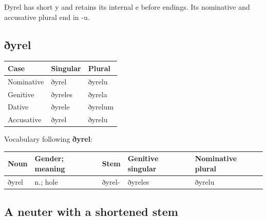 Ðyrel has short y and retains its internal e before endings. Its nominative and accusative plural end in -u.

\subsection*{ðyrel}

\par\begingroup
\fontsize{10.5}{13.2}\selectfont
\setlength{\LTleft}{0pt}\setlength{\LTright}{\fill}
\noindent
\begin{tabular}{@{}>{\raggedright\arraybackslash}p{39.46mm}>{\raggedright\arraybackslash}p{39.46mm}>{\raggedright\arraybackslash}p{39.46mm}@{}}
\toprule
\textbf{Case} & \textbf{Singular} & \textbf{Plural} \\
\midrule
Nominative & ðyrel & ðyrelu \\
Genitive & ðyreles & ðyrela \\
Dative & ðyrele & ðyrelum \\
Accusative & ðyrel & ðyrelu \\
\bottomrule
\end{tabular}
\par\endgroup

Vocabulary following \textbf{ðyrel}:

\par\begingroup
\fontsize{10.5}{13.2}\selectfont
\setlength{\LTleft}{0pt}\setlength{\LTright}{\fill}
\noindent
\begin{tabular}{@{}>{\raggedright\arraybackslash}p{20.21mm}>{\raggedright\arraybackslash}p{21.42mm}>{\raggedright\arraybackslash}p{20.21mm}>{\raggedright\arraybackslash}p{24.35mm}>{\raggedright\arraybackslash}p{26.57mm}@{}}
\toprule
\textbf{Noun} & \textbf{Gender; meaning} & \textbf{Stem} & \textbf{Genitive singular} & \textbf{Nominative plural} \\
\midrule
ðyrel & n.; hole & ðyrel- & ðyreles & ðyrelu \\
\bottomrule
\end{tabular}
\par\endgroup

\subsection*{A neuter with a shortened stem}

